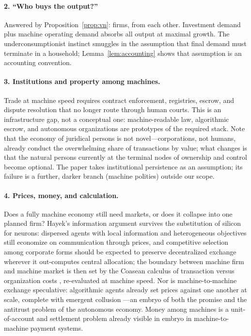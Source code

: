 \documentclass[11pt]{article}
\begin{document}
\paragraph{2. ``Who buys the output?''} Answered by Proposition~\ref{prop:vn}: firms, from each other. Investment demand plus machine operating demand absorbs all output at maximal growth. The underconsumptionist instinct smuggles in the assumption that final demand must terminate in a household; Lemma~\ref{lem:accounting} shows that assumption is an accounting convention.

\paragraph{3. Institutions and property among machines.} Trade at machine speed requires contract enforcement, registries, escrow, and dispute resolution that no longer route through human courts. This is an infrastructure gap, not a conceptual one: machine-readable law, algorithmic escrow, and autonomous organizations are prototypes of the required stack. Note that the economy of juridical persons is not novel---corporations, not humans, already conduct the overwhelming share of transactions by value; what changes is that the natural persons currently at the terminal nodes of ownership and control become optional. The paper takes institutional persistence as an assumption; its failure is a further, darker branch (machine polities) outside our scope.

\paragraph{4. Prices, money, and calculation.} Does a fully machine economy still need markets, or does it collapse into one planned firm? Hayek's information argument \citep{hayek1945} survives the substitution of silicon for neurons: dispersed agents with local information and heterogeneous objectives still economize on communication through prices, and competitive selection among corporate forms should be expected to preserve decentralized exchange wherever it out-computes central allocation; the boundary between machine firm and machine market is then set by the Coasean calculus of transaction versus organization costs \citep{coase1937}, re-evaluated at machine speed. Nor is machine-to-machine exchange speculative: algorithmic agents already set prices against one another at scale, complete with emergent collusion \citep{calvano2020}---an embryo of both the promise and the antitrust problem of the autonomous economy. Money among machines is a unit-of-account and settlement problem already visible in embryo in machine-to-machine payment systems.
\end{document}
